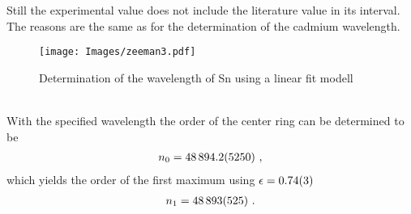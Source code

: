 Still the experimental value does not include the literature value in its interval. 
The reasons are the same as for the determination of the cadmium wavelength.
\begin{figure}[ht]
	\centering
	\texttt{[image: Images/zeeman3.pdf]}
	\caption[Determination of the Wavelength of Sn]{Determination of the wavelength of Sn using a linear fit modell}
	\label{fig:SnWavelengthFit}
\end{figure}\\
With the specified wavelength the order of the center ring can be determined to be
\begin{align}
	n_0 = \num{48894.2 \pm 525.0}\ ,
\end{align}
which yields the order of the first maximum using $\epsilon = \num{0.74 \pm 0.03}$
\begin{align}
	n_1 = \num{48893 \pm 525}\ .
\end{align}
